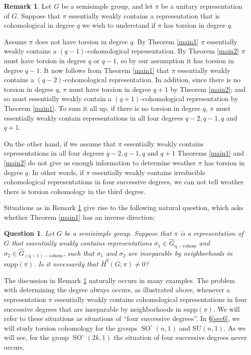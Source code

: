 \documentclass[12pt,reqno]{amsart}
\newtheorem{question}[theorem]{Question}
\theoremstyle{definition}
\newtheorem{remark}[theorem]{Remark}
\newcommand{\SO}{\operatorname{SO}}
\newcommand{\torH}{\mathring{H}}
\begin{document}
\begin{remark}\label{rem:4-degrees}
    Let $G$ be a semisimple group, and let $\pi$ be a unitary representation of $G$. 
    Suppose that $\pi$ essentially weakly contains a representation that is cohomological in degree $q$ we wish to understand if $\pi$ has torsion in degree $q$. 
    
     Assume $\pi$ does not have torsion in degree $q$. By Theorem \ref{main1} $\pi$ essentially weakly contains a $(q-1)$-cohomological representation. By Theorem \ref{main2} $\pi$ must have torsion in degree $q$ or $q-1$, so by our assumption it has torsion in degree $q-1$. It now follows from Theorem \ref{main1} that $\pi$ essentially weakly contains a $(q-2)$-cohomological representation. In addition, since there is no torsion in degree $q$, $\pi$ must have torsion in degree $q+1$ by Theorem \ref{main2}; and so must essentially weakly contain a $(q+1)$-cohomological representation by Theorem \ref{main1}. To sum it all up, if there is no torsion in degree $q$, $\pi$ must essentially weakly contain representations in all four degrees $q-2,q-1,q$ and $q+1$.

    On the other hand, if we assume that $\pi$ essentially weakly contains representations in all four degrees $q-2,q-1,q$ and $q+1$ Theorems \ref{main1} and \ref{main2} do not give us enough information to determine weather $\pi$ has torsion in degree $q$. In other words, if $\pi$ essentially weakly contains irreducible cohomological representations in four successive degrees, we can not tell weather there is torsion cohomology in the third degree. 
\end{remark}
Situations as in Remark \ref{rem:4-degrees} give rise to the following natural question, which asks whether Theorem \ref{main1} has an inverse direction:
\begin{question}\label{q: inverse main1}
    Let $G$ be a semisimple group. Suppose that $\pi$ is a representation of $G$ that essentially weakly contains representations $\sigma_1 \in \widehat{G}_{\mathrm{q-cohom}}$ and $\sigma_2 \in \widehat{G}_{\mathrm{(q-1)-cohom}}$, such that $\sigma_1$ and $\sigma_2$ are inseparable by neighborhoods in $\mathrm{supp}(\pi)$. Is it necessarily that $\torH^q(G;\pi) \ne 0$?
\end{question}
The discussion in Remark \ref{rem:4-degrees} naturally occurs in many examples. The problem with determining the degree always occurs, as illustrated above, whenever a representation $\pi$ essentially weakly contains cohomological representations in four successive degrees that are inseparable by neighborhoods in $\mathrm{supp}(\pi)$. We will refer to these situations as situations of ``four successive degrees''. In \S\ref{sec6}, we will study torsion cohomology for the groups $\SO^\circ(n,1)$ and $\mathrm{SU}(n,1)$. As we will see, for the group $\SO^\circ(2k,1)$ the situation of four successive degrees never occurs,
\end{document}
